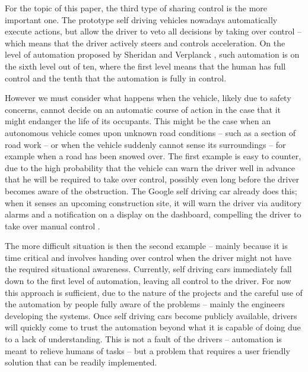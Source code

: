 \documentclass{acm_proc_article-sp}
\begin{document}
For the topic of this paper, the third type of sharing control is the more important one.
The prototype self driving vehicles nowadays automatically execute actions, but allow the driver to veto all decisions by taking over control – which means that the driver actively steers and controls acceleration.
On the level of automation proposed by Sheridan and Verplanck \cite{sheridan:human}, such automation is on the sixth level out of ten, where the first level means that the human has full control and the tenth that the automation is fully in control.

However we must consider what happens when the vehicle, likely due to safety concerns, cannot decide on an automatic course of action in the case that it might endanger the life of its occupants.
This might be the case when an autonomous vehicle comes upon unknown road conditions – such as a section of road work – or when the vehicle suddenly cannot sense its surroundings – for example when a road has been snowed over.
The first example is easy to counter, due to the high probability that the vehicle can warn the driver well in advance that he will be required to take over control, possibly even long before the driver becomes aware of the obstruction.
The Google self driving car already does this; when it senses an upcoming construction site, it will warn the driver via auditory alarms and a notification on a display on the dashboard, compelling the driver to take over manual control \cite{www:newyorker_google_car}.

The more difficult situation is then the second example – mainly because it is time critical and involves handing over control when the driver might not have the required situational awareness.
Currently, self driving cars immediately fall down to the first level of automation, leaving all control to the driver.
For now this approach is sufficient, due to the nature of the projects and the careful use of the automation by people fully aware of the problems – mainly the engineers developing the systems.
Once self driving cars become publicly available, drivers will quickly come to trust the automation beyond what it is capable of doing due to a lack of understanding.
This is not a fault of the drivers – automation is meant to relieve humans of tasks – but a problem that requires a user friendly solution that can be readily implemented.
\end{document}
